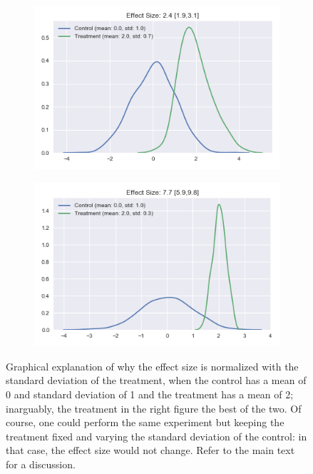 \documentclass[a4paper,11pt]{kth-mag}
\begin{document}
\begin{figure}
    \centering
    \begin{subfigure}[t]{0.49\textwidth}
        \centering
        \includegraphics[width=\textwidth]{images/small_es}
        \label{fig:small_es}
    \end{subfigure}
    \hfill
    \begin{subfigure}[t]{0.49\textwidth}
        \centering
        \includegraphics[width=\textwidth]{images/large_es}
		\label{fig:large_es}
    \end{subfigure}
    \caption{Graphical explanation of why the effect size is normalized with the standard deviation of the treatment, when the control has a mean of 0 and standard deviation of 1 and the treatment has a mean of 2; inarguably, the treatment in the right figure the best of the two. Of course, one could perform the same experiment but keeping the treatment fixed and varying the standard deviation of the control: in that case, the effect size would not change. Refer to the main text for a discussion.}
	\label{fig:effect_size}
\end{figure}
\end{document}
